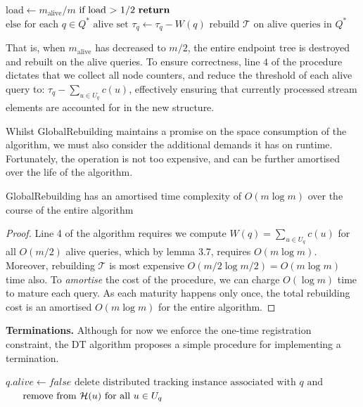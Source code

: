 \begin{algorithm}\label{alg:global-algoritm}
\begin{algorithmic}[1]
\State $\text{load}\gets m_{\text{alive}}/m$ 
\State $\text{if load > 1/2 \textbf{return}}$
\State $\text{else for each $q\in Q^*$ alive set }  \tau_q \gets \tau_q-W(q)$
\State $\text{rebuild $\mathcal{T}$ on alive queries in $Q^*$}$
\EndProcedure
\end{algorithmic}
\end{algorithm}

That is, when $m_{\text{alive}} $ has decreased to $m/2$, the entire endpoint tree is destroyed and rebuilt on the alive queries. To ensure correctness, line $4$ of the procedure dictates that we collect all node counters, and reduce the threshold of each alive query to: $\tau_q - \sum_{u\in U_q} c(u)$, effectively ensuring that currently processed stream elements are accounted for in the new structure.

Whilst GlobalRebuilding maintains a promise on the space consumption of the algorithm, we must also consider the additional demands it has on runtime. Fortunately, the operation is not too expensive, and can be further amortised over the life of the algorithm.

\begin{lemma}
    GlobalRebuilding has an amortised time complexity of $O(m\log m)$ over the course of the entire algorithm
\end{lemma}
\begin{proof}
    Line 4 of the algorithm requires we compute $W(q) = \sum_{u\in U_q}c(u)$ for all $O(m/2)$ alive queries, which by lemma 3.7, requires $O(m\log m)$. Moreover, rebuilding $\mathcal{T}$ is most expensive $O(m/2\log m/2) = O(m\log m)$ time also. To \textit{amortise} the cost of the procedure, we can charge $O(\log m)$ time to mature each query. As each maturity happens only once, the total rebuilding cost is an amortised $O(m\log m)$ for the entire algorithm.
\end{proof}

\textbf{Terminations.} Although for now we enforce the one-time registration constraint, the DT algorithm proposes a simple procedure for implementing a termination.

\begin{algorithm}\label{alg:global-algoritm}
\begin{algorithmic}[1]
\State $q.alive\gets false$
\State $\text{delete distributed tracking instance associated with $q$ and}$
\Statex $\hspace{6mm}\text{remove from $\mathcal{H}(u)$ for all $u\in U_q$}$
\EndProcedure
\end{algorithmic}
\end{algorithm}

